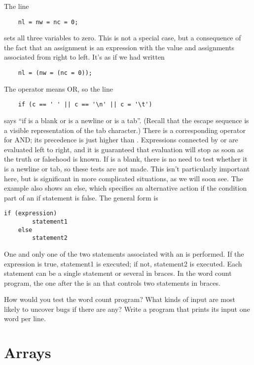 The line
\begin{lstlisting}
	nl = nw = nc = 0;
\end{lstlisting}
sets all three variables to zero.
This is not a special case, but a consequence of the fact that an assignment is an expression with the value and assignments associated from right to left.
It's as if we had written
\begin{lstlisting}
	nl = (nw = (nc = 0));
\end{lstlisting}
The operator \code{||} means OR, so the line
\begin{lstlisting}
	if (c == ' ' || c == '\n' || c = '\t')
\end{lstlisting}
says ``if  is a blank or  is a newline or  is a tab''.
(Recall that the escape sequence  is a visible representation of the tab character.)
There is a corresponding operator \code{\&\&} for AND; its precedence is just higher than \code{||}.
Expressions connected by \code{\&\&} or \code{||} are evaluated left to right, and it is guaranteed that evaluation will stop as soon as the truth or falsehood is known.
If  is a blank, there is no need to test whether it is a newline or tab, so these tests are not made.
This isn't particularly important here, but is significant in more complicated situations, as we will soon see.
The example also shows an else, which specifies an alternative action if the condition part of an if statement is false.
The general form is
\begin{lstlisting}[basicstyle=\ttfamily\normalsize\itshape, keywordstyle=\color{black}]
	if (expression)
		statement1
	else
		statement2
\end{lstlisting}
One and only one of the two statements associated with an  is performed.
If the expression is true, statement1 is executed; if not, statement2 is executed.
Each statement can be a single statement or several in braces.
In the word count program, the one after the  is an  that controls two statements in braces.
\newline

\begin{ExerciseList}
\Exercise How would you test the word count program? What kinds of input are most likely to uncover bugs if there are any?
\Exercise Write a program that prints its input one word per line.
\end{ExerciseList}


\section{Arrays}


